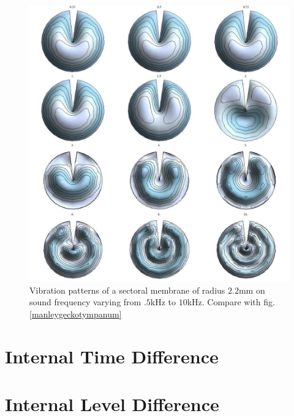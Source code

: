 \begin{figure}[ht!]
 \centering
 \includegraphics[width=.75\linewidth]{Diagrams/SectorMembraneModes/sector_membrane_all.png}
 \caption[Sectoral membrane vibration profiles.]{Vibration patterns of a sectoral membrane
 of radius $2.2$mm on sound frequency varying from $.5$kHz to $10$kHz. Compare with fig. \ref{manleygeckotympanum}}
  \label{sectormembraneprofile}
\end{figure}

\section{Internal Time Difference}

\section{Internal Level Difference}